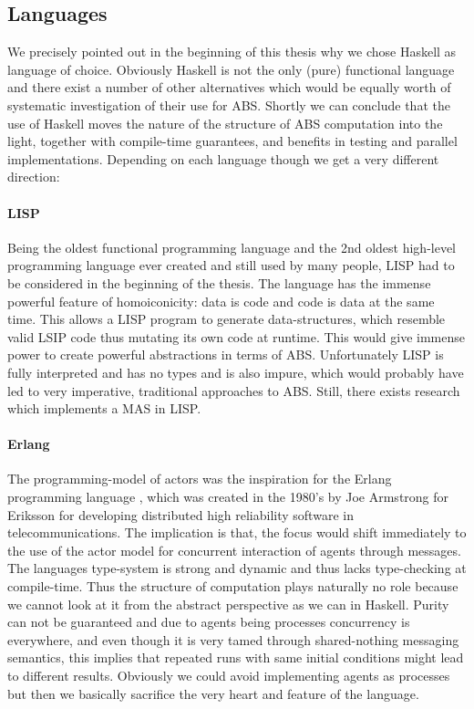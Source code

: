 \subsection{Languages}
We precisely pointed out in the beginning of this thesis why we chose Haskell as language of choice. Obviously Haskell is not the only (pure) functional language and there exist a number of other alternatives which would be equally worth of systematic investigation of their use for ABS. Shortly we can conclude that the use of Haskell moves the nature of the structure of ABS computation into the light, together with compile-time guarantees, and benefits in testing and parallel implementations. Depending on each language though we get a very different direction:

\paragraph{LISP} Being the oldest functional programming language and the 2nd oldest high-level programming language ever created and still used by many people, LISP had to be considered in the beginning of the thesis. The language has the immense powerful feature of homoiconicity: data is code and code is data at the same time. This allows a LISP program to generate data-structures, which resemble valid LSIP code thus mutating its own code at runtime. This would give immense power to create powerful abstractions in terms of ABS. Unfortunately LISP is fully interpreted and has no types and is also impure, which would probably have led to very imperative, traditional approaches to ABS. Still, there exists research \cite{kawabe_nepi2programming_2000} which implements a MAS in LISP.
	
\paragraph{Erlang} The programming-model of actors \cite{agha_actors:_1986} was the inspiration for the Erlang programming language \cite{armstrong_erlang_2010}, which was created in the 1980's by Joe Armstrong for Eriksson for developing distributed high reliability software in telecommunications. The implication is that, the focus would shift immediately to the use of the actor model for concurrent interaction of agents through messages. The languages type-system is strong and dynamic and thus lacks type-checking at compile-time. Thus the structure of computation plays naturally no role because we cannot look at it from the abstract perspective as we can in Haskell. Purity can not be guaranteed and due to agents being processes concurrency is everywhere, and even though it is very tamed through shared-nothing messaging semantics, this implies that repeated runs with same initial conditions might lead to different results. Obviously we could avoid implementing agents as processes but then we basically sacrifice the very heart and feature of the language.
	
